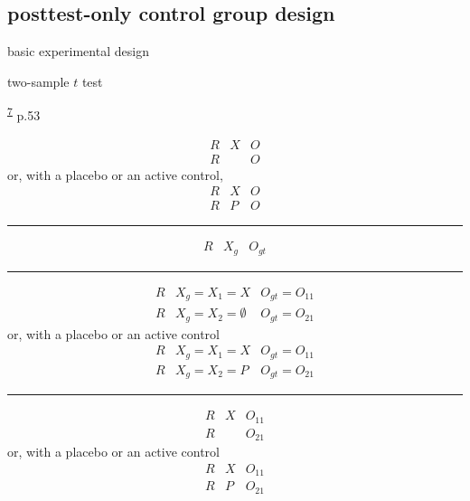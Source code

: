 \documentclass[
]{book}
\theoremstyle{definition}
\theoremstyle{definition}
\theoremstyle{definition}
\theoremstyle{definition}
\theoremstyle{remark}
\begin{document}
\hypertarget{posttest-only-control-group-design}{%
\subsection{posttest-only control group design}\label{posttest-only-control-group-design}}

basic experimental design

two-sample \(t\) test

\textsuperscript{\protect\hyperlink{ref-hu2022}{7}} p.53

\[
\begin{array}{ccc}
R & X & O\\
R &  & O
\end{array}
\]
or, with a placebo or an active control,
\[
\begin{array}{ccc}
R & X & O\\
R & P & O
\end{array}
\]

\begin{center}\rule{0.5\linewidth}{0.5pt}\end{center}

\[
\begin{array}{ccc}
R & X_{g} & O_{gt}\end{array}
\]

\begin{center}\rule{0.5\linewidth}{0.5pt}\end{center}

\[
\begin{array}{ccc}
R & X_{g}=X_{1}=X & O_{gt}=O_{11}\\
R & X_{g}=X_{2}=\emptyset & O_{gt}=O_{21}
\end{array}
\]
or, with a placebo or an active control
\[
\begin{array}{ccc}
R & X_{g}=X_{1}=X & O_{gt}=O_{11}\\
R & X_{g}=X_{2}=P & O_{gt}=O_{21}
\end{array}
\]

\begin{center}\rule{0.5\linewidth}{0.5pt}\end{center}

\[
\begin{array}{ccc}
R & X & O_{11}\\
R &  & O_{21}
\end{array}
\]
or, with a placebo or an active control
\[
\begin{array}{ccc}
R & X & O_{11}\\
R & P & O_{21}
\end{array}
\]
\end{document}
